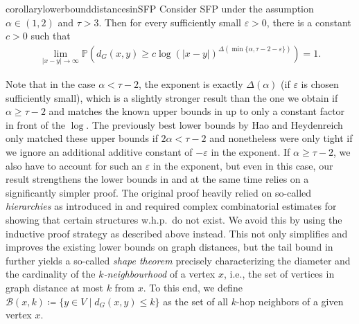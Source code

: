 \documentclass[11pt, letterpaper, margin=1in]{amsart}
\theoremstyle{definition}
\theoremstyle{remark}
\renewcommand{\Pr}[1]{\ensuremath{\mathbb{P} \left(#1 \right) }}
\newcommand{\dg}[2]{\ensuremath{ \ensuremath{ d_G(#1, #2) } }}
\numberwithin{equation}{section}
\begin{document}
\begin{restatable}{corollary}{lowerbounddistancesinSFP}\label{cor:lowerboundSFP}
     Consider SFP under the assumption $\alpha \in (1,2)$ and $\tau > 3$. Then for every sufficiently small $\varepsilon > 0$, there is a constant $c > 0$ such that \begin{align*}
        \lim_{|x-y| \rightarrow \infty} \Pr{ \dg{x}{y} \ge c \log(|x-y|)^{ \Delta(\min\{\alpha, \tau - 2-\varepsilon \})} } = 1.
     \end{align*}
\end{restatable}

Note that in the case $\alpha < \tau - 2$, the exponent is exactly $\Delta(\alpha)$ (if $\varepsilon$ is chosen sufficiently small), which is a slightly stronger result than the one we obtain if $\alpha \ge \tau - 2$ and matches the known upper bounds in \cite{Biskup_Lin_2019} up to only a constant factor in front of the $\log$. The previously best lower bounds by Hao and Heydenreich \cite{hao2023graph} only matched these upper bounds if $2\alpha < \tau - 2$ and nonetheless were only tight if we ignore an additional additive constant of $-\varepsilon$ in the exponent. If $\alpha \ge \tau - 2$, we also have to account for such an $\varepsilon$ in the exponent, but even in this case,
our result strengthens the lower bounds in \cite{hao2023graph} and at the same time relies on a significantly simpler proof. The original proof heavily relied on so-called \emph{hierarchies} as introduced in \cite{Biskup_2004} and required complex combinatorial estimates for showing that certain structures w.h.p.\ do not exist. We avoid this by using the inductive proof strategy as described above instead. This not only simplifies and improves the existing lower bounds on graph distances, but the tail bound in  further yields a so-called \emph{shape theorem} precisely characterizing the diameter and the cardinality of the \emph{$k$-neighbourhood} of a vertex $x$, i.e., the set of vertices in graph distance at most $k$ from $x$. To this end, we define $\mathcal{B}(x, k) \coloneqq \{ y \in V \mid \dg{x}{y} \le k \}$ as the set of all $k$-hop neighbors of a given vertex $x$. 

\newcommand{\nearvertices}{\mathcal{X}_{low}}
\newcommand{\farvertices}{\mathcal{X}_{upp}}
\end{document}
